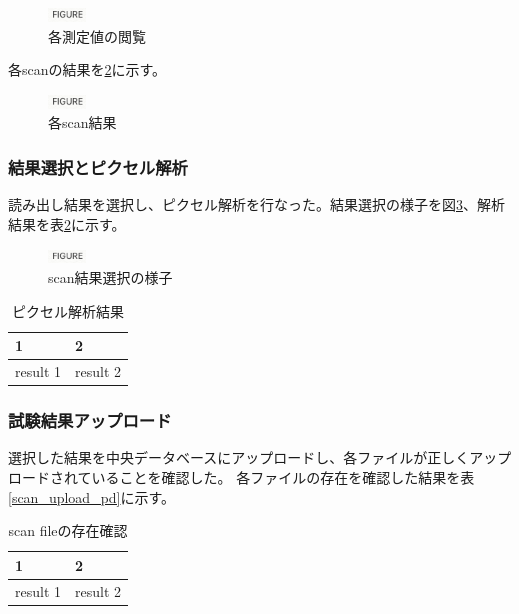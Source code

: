 \begin{figure}[bpt]\centering
\includegraphics[width=1cm]{figure}
\caption[各測定値の閲覧]{各測定値の閲覧}
\label{view_dcs}
\end{figure}

各scanの結果を\ref{scan_result}に示す。

\begin{figure}[bpt]\centering
\includegraphics[width=1cm]{figure}
\caption[各scan結果]{各scan結果}
\label{scan_result}
\end{figure}

\subsubsection{結果選択とピクセル解析}
読み出し結果を選択し、ピクセル解析を行なった。結果選択の様子を図\ref{select_scans}、解析結果を表\ref{pixel_analysis_result}に示す。

\begin{figure}[bpt]\centering
\includegraphics[width=1cm]{figure}
\caption[scan結果選択の様子]{scan結果選択の様子}
\label{select_scans}
\end{figure}

\begin{table}[tbp]
\begin{center}
\caption[ピクセル解析結果]{ピクセル解析結果}
\label{pixel_analysis_result}
  \begin{tabular}{|ll|} \hline
    1 & 2 \\ \hline
    result 1 & result 2 \\ \hline 
  \end{tabular}
\end{center}
\end{table}

\subsubsection{試験結果アップロード}
選択した結果を中央データベースにアップロードし、各ファイルが正しくアップロードされていることを確認した。
各ファイルの存在を確認した結果を表\ref{scan_upload_pd}に示す。

\begin{table}[tbp]
\begin{center}
\caption[scan fileの存在確認]{scan fileの存在確認}
\label{pixel_analysis_result}
  \begin{tabular}{|ll|} \hline
    1 & 2 \\ \hline
    result 1 & result 2 \\ \hline 
  \end{tabular}
\end{center}
\end{table}

